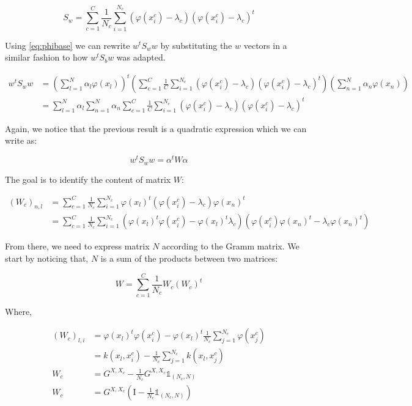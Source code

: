 \begin{equation*}
S_w = \sum_{c = 1}^C \frac{1}{N_c} \sum_{i = 1}^{N_c} (\varphi(x_i^c) - \lambda_c)(\varphi(x_i^c) -
\lambda_c)^t
\end{equation*}

Using \ref{eq:phibase} we can rewrite $w^tS_ww$ by substituting the $w$ vectors in a similar fashion
to how $w^tS_bw$ was adapted.

\begin{align*}
  w^tS_ww &= \left( \sum_{l=1}^N \alpha_l \varphi(x_l)\right)^t
             \left( \sum_{c=1}^C \frac{1}{C}
                       \sum_{i=1}^{N_c} (\varphi(x_i^c) - \lambda_c)
                                        (\varphi(x_i^c) - \lambda_c)^t\right)
             \left( \sum_{n=1}^N \alpha_n \varphi(x_n)\right)\\
          &= \sum_{l=1}^N \alpha_l \sum_{n=1}^N \alpha_n \sum_{c=1}^C \frac{1}{C}
                \sum_{i=1}^{N_c} (\varphi(x_i^c) - \lambda_c)
                                 (\varphi(x_i^c) - \lambda_c)^t
\end{align*}

Again, we notice that the previous result is a quadratic expression which we can write as:

\begin{equation*}
w^tS_ww = \alpha^tW\alpha
\end{equation*}

The goal is to identify the content of matrix $W$:

\begin{align*}
  (W_c)_{n,l} &= \sum_{c=1}^C \frac{1}{N_c} \sum_{i=1}^{N_c}
                  \varphi(x_l)^t(\varphi(x_i^c) - \lambda_c)\varphi(x_n)^t \\
            &= \sum_{c=1}^C \frac{1}{N_c} \sum_{i=1}^{N_c} (\varphi(x_l)^t\varphi(x_i^c) -
            \varphi(x_l)^t\lambda_c) (\varphi(x_i^c)\varphi(x_n)^t -
            \lambda_c \varphi(x_n)^t)
\end{align*}

From there, we need to express matrix $N$ according to the Gramm matrix. We start by noticing that,
$N$ is a sum of the products between two matrices:

\begin{equation*}
W = \sum_{c=1}^C \frac{1}{N_c} W_c (W_c)^t
\end{equation*}

Where,

\begin{align*}
  (W_c)_{l, i} &= \varphi(x_l)^t\varphi(x_i^c) - \varphi(x_l)^t \frac{1}{N_c}\sum_{j=1}^{N_c}\varphi(x_j^c) \\
             &= k(x_l, x_i^c) - \frac{1}{N_c}\sum_{j=1}^{N_c}k(x_l, x_j^c) \\
   W_c       &= G^{X, X_c} - \frac{1}{N_c} G^{X, X_c} \mathds{1}_{(N_c, N)} \\
   W_c       &= G^{X, X_c} \left(\textrm{I} - \frac{1}{N_c}\mathds{1}_{(N_c, N)}\right)
\end{align*}

